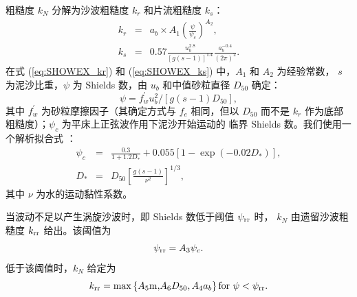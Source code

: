 粗糙度 $k_{N}$ 分解为沙波粗糙度 $k_{r}$ 和片流粗糙度 $k_{s}$：
\begin{eqnarray}
k_{r} &=&a_{b}\times A_{1}\left( \frac{\psi }{\psi _{c}}\right) ^{A_{2}}, \label{eq:SHOWEX_kr}\\
k_{s} &=&0.57\frac{u_{b}^{2.8}}{\left[ g\left( s-1\right) \right] ^{1.4}}%
\frac{a_{b}^{-0.4}}{\left( 2\pi \right) ^{2}}\label{eq:SHOWEX_ks}.
\end{eqnarray}
在式 (\ref{eq:SHOWEX_kr}) 和 (\ref{eq:SHOWEX_ks}) 中，$A_1$ 和 $A_2$ 为经验常数，
$s$ 为泥沙比重，$\psi$ 为 Shields 数，由 $u_b$ 和中值砂粒直径 $D_{50}$ 确定：
\begin{equation}
\psi =f_{w}^{\prime }u_{b}^{2}/\left[g\left( s-1\right) D_{50}\right],
\end{equation}
其中 $f_{w}^{\prime }$ 为砂粒摩擦因子（其确定方式与 $f_e$ 相同，但以 $D_{50}$
而不是 $k_r$ 作为底部粗糙度）；$\psi _{c}$ 为平床上正弦波作用下泥沙开始运动的
临界 Shields 数。我们使用一个解析拟合式 \citep{bk:Soul97}：
\begin{eqnarray}
\psi _{c} &=&\frac{0.3}{1+1.2D_{*}}+0.055\left[ 1-\exp \left(
-0.02D_{*}\right) \right]\label{Soulsby_psic} , \\
D_{*} &=&D_{50}\left[ \frac{g\left( s-1\right) }{\nu ^{2}}\right] ^{1/3},
\end{eqnarray}
其中 $\nu $ 为水的运动黏性系数。

当波动不足以产生涡旋沙波时，即 Shields 数低于阈值 $\psi _{{\rm rr}}$ 时，
$k_{N}$ 由遗留沙波粗糙度 $k_{{\rm rr}}$ 给出。该阈值为
\begin{equation}
\psi _{{\rm rr}}=A_{3}\psi _{c}.
\end{equation}
低于该阈值时，$k_{N}$ 给定为
\begin{equation}
k_{{\rm rr}}=\max \left\{ A_5 {\rm m,} A_6 D_{50}, A_{4}a_{b}\right\}
{\rm for\ }\psi <\psi _{{\rm rr}}.\label{eq:SHOWEX_krr}
\end{equation}
